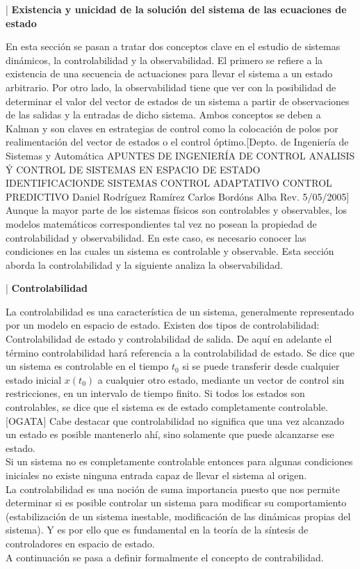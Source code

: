 \documentclass[10pt,a4paper]{article}
\begin{document}
\begin{center}|
{\Large \textbf{Existencia y unicidad de la soluci\' on del sistema de las ecuaciones de estado}}\\
\end{center}
En esta secci\' on se pasan a tratar dos conceptos clave en el estudio de sistemas din\' amicos, la controlabilidad y la observabilidad. El primero se refiere a la existencia de una secuencia de actuaciones para llevar el sistema a un estado arbitrario. Por otro lado, la observabilidad tiene que ver con la posibilidad de determinar el valor del vector de estados de un sistema a partir de observaciones de las salidas y la entradas de dicho sistema. Ambos conceptos se deben a Kalman y son claves en estrategias de control como la colocaci\' on de polos por realimentaci\' on del vector de estados o el control
\' optimo.[Depto. de Ingenier\' ia de Sistemas y Autom\' atica APUNTES DE INGENIER\' IA DE CONTROL ANALISIS \'  Y CONTROL DE SISTEMAS EN ESPACIO DE ESTADO IDENTIFICACION\'  DE SISTEMAS CONTROL ADAPTATIVO CONTROL PREDICTIVO Daniel Rodr\' iguez Ram\' irez Carlos Bord\' ons Alba Rev. 5/05/2005]
Aunque la mayor parte de los sistemas físicos son controlables y observables, los modelos matemáticos correspondientes tal vez no posean la propiedad de controlabilidad y observabilidad. En este caso, es necesario conocer las condiciones en
las cuales un sistema es controlable y observable. Esta sección aborda la controlabilidad y la
siguiente analiza la observabilidad.
\begin{center}|
{\Large \textbf{ Controlabilidad}}\\
\end{center}
La controlabilidad es una característica de un sistema, generalmente representado por un modelo en espacio de estado. Existen dos tipos de controlabilidad: Controlabilidad de estado y controlabilidad de salida. De aqu\' i en adelante el t\' ermino controlabilidad har\' a referencia a la controlabilidad de estado.
Se dice que un sistema es controlable en el tiempo $t_{0}$ si se puede transferir desde cualquier estado inicial $x(t_{0})$ a cualquier otro estado, mediante un vector de control sin restricciones, en un intervalo de tiempo finito. Si todos los estados son controlables, se dice que el sistema es de estado completamente controlable.[OGATA]
Cabe destacar que controlabilidad no significa que una vez alcanzado un estado es posible mantenerlo ahí, sino solamente que puede alcanzarse ese estado.\\Si un sistema no es completamente controlable entonces para algunas condiciones iniciales no existe ninguna entrada capaz de llevar el sistema al origen.\\La controlabilidad es una noción de suma importancia puesto que nos permite determinar si es posible controlar un sistema para modificar su comportamiento (estabilización de un sistema inestable, modificación de las dinámicas propias del sistema). Y es por ello que es fundamental en la teoría de la síntesis de controladores en espacio de estado.\\
A continuaci\' on se pasa a definir formalmente el concepto de contrabilidad.
\end{document}
